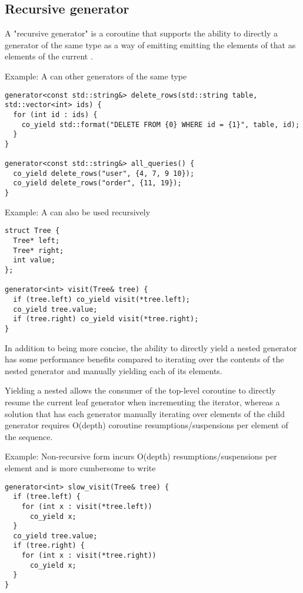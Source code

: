 \documentclass{wg21}
\begin{document}
\subsection{Recursive generator}

A "recursive generator" is a coroutine that supports the ability to directly 
a generator of the same type as a way of emitting emitting the elements of that 
as elements of the current .

Example: A  can  other generators of the same type
\begin{lstlisting}[style=color]
generator<const std::string&> delete_rows(std::string table, std::vector<int> ids) {
  for (int id : ids) {
    co_yield std::format("DELETE FROM {0} WHERE id = {1}", table, id);
  }
}

generator<const std::string&> all_queries() {
  co_yield delete_rows("user", {4, 7, 9 10});
  co_yield delete_rows("order", {11, 19});
}
\end{lstlisting}

Example: A  can also be used recursively
\begin{lstlisting}[style=color]
struct Tree {
  Tree* left;
  Tree* right;
  int value;
};

generator<int> visit(Tree& tree) {
  if (tree.left) co_yield visit(*tree.left);
  co_yield tree.value;
  if (tree.right) co_yield visit(*tree.right);
}
\end{lstlisting}

In addition to being more concise, the ability to directly yield a nested generator has some
performance benefits compared to iterating over the contents of the nested generator and
manually yielding each of its elements.

Yielding a nested  allows the consumer of the top-level coroutine to
directly resume the current leaf generator when incrementing the iterator, whereas a
solution that has each generator manually iterating over elements of the child generator
requires O(depth) coroutine resumptions/suspensions per element of the sequence.

Example: Non-recursive form incurs O(depth) resumptions/suspensions per element
and is more cumbersome to write
\begin{lstlisting}[style=color]
generator<int> slow_visit(Tree& tree) {
  if (tree.left) {
    for (int x : visit(*tree.left))
      co_yield x;
  }
  co_yield tree.value;
  if (tree.right) {
    for (int x : visit(*tree.right))
      co_yield x;
  }
}
\end{lstlisting}
\end{document}
